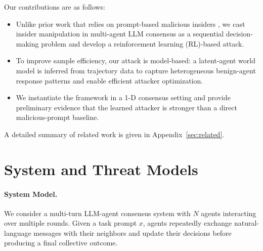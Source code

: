 \documentclass{article}
\theoremstyle{plain}
\theoremstyle{definition}
\theoremstyle{remark}
\begin{document}
Our contributions are as follows:
\vspace{-2ex}
\begin{itemize}[leftmargin=*, itemsep=4pt, topsep=5pt, parsep=0pt]
    \item Unlike prior work that relies on prompt-based malicious insiders \citep{anthropic2025agentic,hu2025masattack}, we cast insider manipulation in multi-agent LLM consensus as a sequential decision-making problem and develop a reinforcement learning (RL)-based attack.
    \item To improve sample efficiency, our attack is model-based: a latent-agent world model is inferred from trajectory data to capture heterogeneous benign-agent response patterns and enable efficient attacker optimization.
    \item We instantiate the framework in a 1-D consensus setting and provide preliminary evidence that the learned attacker is stronger than a direct malicious-prompt baseline.
\end{itemize}
\vspace{-1ex}
A detailed summary of related work is given in Appendix~\ref{sec:related}.

\vspace{-0.5ex}
\section{System and Threat Models}

\paragraph{System Model.}
We consider a multi-turn LLM-agent consensus system with $N$ agents interacting over multiple rounds. Given a task prompt $x$, agents repeatedly exchange natural-language messages with their neighbors and update their decisions before producing a final collective outcome.
\end{document}
